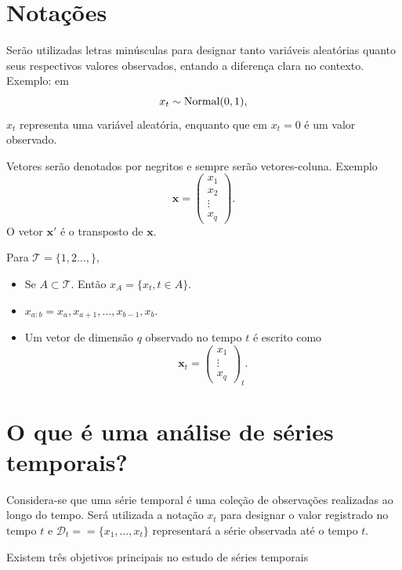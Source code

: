 \documentclass[
  letterpaper,
  DIV=11,
  numbers=noendperiod]{scrartcl}
\providecommand{\tightlist}{%
  \setlength{\itemsep}{0pt}\setlength{\parskip}{0pt}}\usepackage{longtable,booktabs,array}
\theoremstyle{plain}
\theoremstyle{plain}
\theoremstyle{definition}
\theoremstyle{definition}
\theoremstyle{remark}
\begin{document}
\hypertarget{notauxe7uxf5es}{%
\section{Notações}\label{notauxe7uxf5es}}

Serão utilizadas letras minúsculas para designar tanto variáveis
aleatórias quanto seus respectivos valores observados, entando a
diferença clara no contexto. Exemplo: em \[x_t\sim\hbox{Normal}(0,1),\]
\(x_t\) representa uma variável aleatória, enquanto que em \(x_t=0\) é
um valor observado.

Vetores serão denotados por negritos e sempre serão vetores-coluna.
Exemplo
\[\boldsymbol{x}=\left(\begin{array}{c}x_1 \\ x_2 \\ \vdots \\ x_q\end{array}\right).\]
O vetor \(\boldsymbol{x}'\) é o transposto de \(\boldsymbol{x}\).

Para \(\mathcal{T}=\{1,2\ldots,\}\),

\begin{itemize}
\tightlist
\item
  Se \(A\subset\mathcal{T}\). Então \(x_A=\{x_{t},t\in A\}\).
\item
  \(x_{a:b}=x_a,x_{a+1},\ldots,x_{b-1},x_{b}.\)
\item
  Um vetor de dimensão \(q\) observado no tempo \(t\) é escrito como
  \[\boldsymbol{x}_t =\left(\begin{array}{c}x_{1} \\ \vdots \\ x_{q}\end{array}\right)_{t}.\]
\end{itemize}

\hypertarget{o-que-uxe9-uma-anuxe1lise-de-suxe9ries-temporais}{%
\section{O que é uma análise de séries
temporais?}\label{o-que-uxe9-uma-anuxe1lise-de-suxe9ries-temporais}}

Considera-se que uma série temporal é uma coleção de observações
realizadas ao longo do tempo. Será utilizada a notação \(x_t\) para
designar o valor registrado no tempo \(t\) e
\(\mathcal{D}_t==\{x_1,\ldots,x_t\}\) representará a série observada até
o tempo \(t\).

Existem três objetivos principais no estudo de séries temporais
\end{document}
